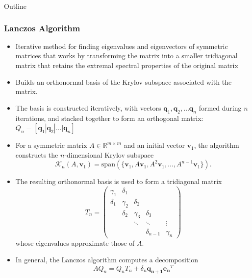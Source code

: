 \documentclass[landscape]{beamer}
\begin{document}
\begin{frame}[allowframebreaks]{Outline}
	\frametitle{Lanczos Algorithm}
	\begin{itemize}
		\item Iterative method for finding eigenvalues and eigenvectors of symmetric matrices that works by transforming the matrix into a smaller tridiagonal matrix that retains the extremal spectral properties of the original matrix
		\item Builds an orthonormal basis of the Krylov subspace associated with the matrix.
		\item The basis is constructed iteratively, with vectors $\mathbf{q}_1, \mathbf{q}_2, \ldots \mathbf{q}_n$ formed during $n$ iterations, and stacked together to form an orthogonal matrix: $Q_n = [\mathbf{q}_1 | \mathbf{q}_2 | \ldots | \mathbf{q}_n]$
		\item For a symmetric matrix $A \in \mathbb{R}^{m\times m}$ and an initial vector $\mathbf{v}_1$, the algorithm constructs the $n$-dimensional Krylov subspace
		\begin{equation*}
			\mathcal{K}_n(A, \mathbf{v}_1) = \text{span}(\{\mathbf{v}_1, A\mathbf{v}_1, A^2\mathbf{v}_1, \ldots, A^{n-1}\mathbf{v}_1\}).
		\end{equation*}
		\item The resulting orthonormal basis is used to form a tridiagonal matrix 
		\[T_n = \begin{pmatrix}
			\gamma_1 & \delta_1 & & & \\\delta_1 & \gamma_2 & \delta_2 & & \\ & \delta_2 & \gamma_3 & \delta_3 & \\ & & \ddots & \ddots & \vdots \\ & & & \delta_{n-1} & \gamma_n
		\end{pmatrix}\] 
		whose eigenvalues approximate those of $A$.
		\item In general, the Lanczos algorithm computes a decomposition
		\begin{equation*}
			AQ_n = Q_nT_n + \delta_{n}\mathbf{q_{n+1}}\mathbf{e_n}^T
		\end{equation*}
	\end{itemize}
\end{frame}
\end{document}
